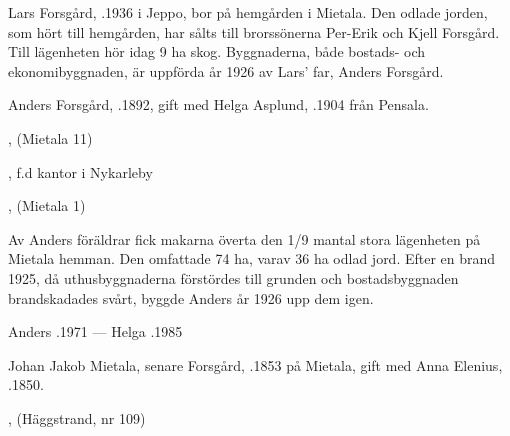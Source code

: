 


Lars Forsgård, .1936 i Jeppo, bor på hemgården i Mietala. Den odlade jorden, som hört till hemgården, har sålts till brorssönerna Per-Erik och Kjell Forsgård. Till lägenheten hör idag 9 ha skog. Byggnaderna, både bostads- och ekonomibyggnaden, är uppförda år 1926 av Lars' far, Anders Forsgård.


Anders Forsgård, .1892, gift med Helga Asplund, .1904 från Pensala.
\begin{jhchildren}
  \item {}, (Mietala 11)
  \item {}, f.d kantor i Nykarleby
  \item {}, (Mietala  1)
  \item {}
  \item {}
\end{jhchildren}

Av Anders föräldrar fick makarna överta den 1/9 mantal stora lägenheten på Mietala hemman. Den omfattade 74 ha, varav 36 ha odlad jord. Efter en brand 1925, då uthusbyggnaderna förstördes till grunden och  bostadsbyggnaden  brandskadades svårt, byggde Anders år 1926 upp dem igen.

Anders .1971  ---  Helga .1985






Johan Jakob Mietala, senare Forsgård, .1853 på Mietala, gift med Anna Elenius, .1850.
\begin{jhchildren}
  \item {}, (Häggstrand, nr 109)
  \item {}
  \item {}
  \item {}
  \item {}
  \item {}
  \item {}
\end{jhchildren}

